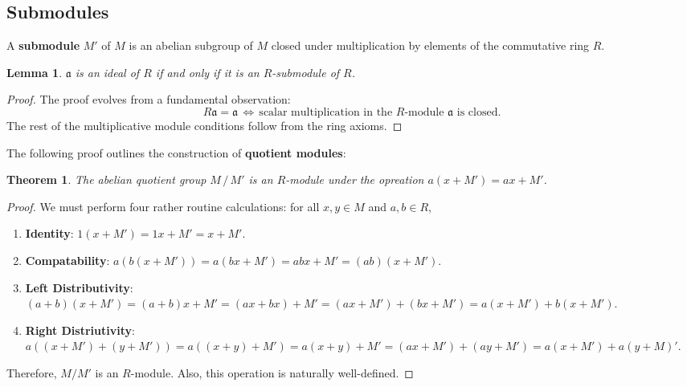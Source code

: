\documentclass[11pt]{article}
\newtheorem{theorem}{Theorem}
\newtheorem{lemma}{Lemma}
\begin{document}

\subsection{Submodules}

A \textbf{submodule} $M'$ of $M$ is an abelian subgroup of $M$ closed under multiplication by elements of the commutative ring $R$. 

\begin{adjustwidth}{0.5cm}{}
  \begin{lemma}
    $\mathfrak{a}$ is an ideal of $R$ if and only if it is an $R$-submodule of $R$.
  \end{lemma}
  \begin{proof}
    The proof evolves from a fundamental observation:
    \[
      R \mathfrak{a} = \mathfrak{a} \, \iff \, \text{scalar multiplication in the $R$-module $\mathfrak{a}$ is closed}.
    \]
    The rest of the multiplicative module conditions follow from the ring axioms.
  \end{proof}
\end{adjustwidth}

The following proof outlines the construction of \textbf{quotient modules}:

\begin{adjustwidth}{0.5cm}{}
	\begin{theorem}
		The abelian quotient group $M \, / \, M'$ is an $R$-module under the opreation $a(x + M') = ax + M'$.
	\end{theorem}
	\begin{proof}
		We must perform four rather routine calculations: for all $x, y \in M$ and $a, b \in R$,
		\begin{enumerate}
      \item \textbf{Identity}: $1(x + M') = 1x + M' = x + M'$.
      \item \textbf{Compatability}: $a(b(x + M')) = a(bx + M') = abx + M' = (ab)(x + M')$.
			\item \textbf{Left Distributivity}: $(a + b)(x + M') = (a + b)x + M' = (ax + bx) + M' = (ax + M') + (bx + M') = a(x + M') + b(x + M')$.
			\item \textbf{Right Distriutivity}: $a((x + M') + (y + M')) = a((x + y) + M') = a(x + y) + M' = (ax + M') + (ay + M') = a(x + M') + a(y + M)'$.
		\end{enumerate}
		Therefore, $M / M'$ is an $R$-module. Also, this operation is naturally well-defined.
	\end{proof}
\end{adjustwidth}
\end{document}

